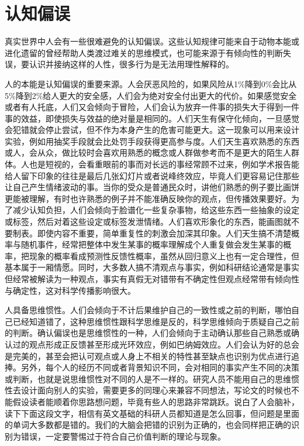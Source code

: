 \documentclass[]{tufte-book}
\begin{document}
\hypertarget{ux8ba4ux77e5ux504fux8bef}{%
\section{认知偏误}\label{ux8ba4ux77e5ux504fux8bef}}

真实世界中人会有一些很难避免的认知偏误。这些认知规律可能来自于动物本能或进化遗留的曾经帮助人类渡过难关的思维模式，也可能来源于有倾向性的判断失误，要认识并接纳这样的人性，很多行为是无法用理性解释的。

人的本能是认知偏误的重要来源。人会厌恶风险的，如果风险从1\%降到0\%会比从5\%降到2\%给人更大的安全感，人们会为绝对安全付出更大的代价。如果感觉安全或者有人托底，人们又会倾向于冒险，人们会认为放弃一件事的损失大于得到一件事的效益，即使损失与效益的绝对量是相同的。人们天生有保守化倾向，一旦感觉会犯错就会停止尝试，但不作为本身产生的危害可能更大。这一现象可以用来设计实验，例如用抽奖手段就会比处罚手段获得更高参与度。人们天生喜欢熟悉的东西或人，会从众，做比较时会喜欢用熟悉的概念或人群做参考而不是更大的陌生人群体。人也是短视的，会看重眼前的事而对长远的事经常顾不过来，例如学术报告能给人留下印象的往往是最后几张幻灯片或者说峰终效应，毕竟人们更容易记住那些让自己产生情绪波动的事。当你的受众是普通民众时，讲他们熟悉的例子要比画饼更能被理解，有时也许熟悉的例子并不能准确反映你的观点，但传播效果要好。为了减少认知负担，人们会倾向于脸谱化一些复杂事物，给这些东西一些抽象的设定或标签，然后对着这些设定或标签发泄情绪。人们喜欢形象化的东西，能画图就不要制表。即使内容不重要，简单重复性的刺激会加深其印象。人们天生搞不清楚概率与随机事件，经常把整体中发生某事的概率理解成个人重复做会发生某事的概率，把现象的概率看成预测性反馈性概率，虽然从回归意义上也有一定合理性，但基本属于一厢情愿。同时，大多数人搞不清观点与事实，例如科研结论通常是事实但经常被解读为一种观点，事实有真假无对错带有不确定性但观点经常带有倾向性与确定性，这对科学传播影响很大。

人具备思维惯性。人们会倾向于不计后果维护自己的一致性或之前的判断，哪怕自己已经知道错了，这种思维惯性跟科学思维是反的，科学思维倾向于质疑自己之前的判断。确认偏误也是思维惯性的一种，人们会倾向于主动确认那些自己熟悉或确认过的观点形成正反馈甚至形成光环效应，例如巴纳姆效应。人们会认为好的总会是完美的，甚至会把认可观点或人身上不相关的特性甚至缺点也识别为优点进行追捧。另外，每个人的经历不同或者背景知识不同，会对相同的事实产生不同的决策或判断，也就是说思维惯性对不同的人是不一样的。研究人员不能用自己的思维惯性去设计面向别人的实验，需要更多的同理心来兼容不同想法，写论文的时候也不能假设读者能顺着你思路想问题，毕竟有些人的思路非常跳跃。说白了人会脑补，读下下面这段文字，相信有英文基础的科研人员都知道是怎么回事，但问题是里面的单词大多数都是错的。我们的大脑会把错的识别为正确的，也会同样把正确的识别为错误，一定要警惕过于符合自己价值判断的理论与现象。
\end{document}
